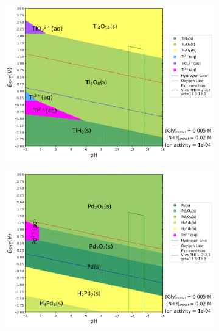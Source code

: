 \documentclass[journal=jacsat,manuscript=article]{achemso}
\begin{document}
\begin{figure}[htbp]
\begin{subfigure}[b]{0.3\textwidth}
        \par\medskip   
    \end{subfigure}
    \begin{subfigure}[b]{0.3\textwidth}
        \includegraphics[width=\textwidth]{Figures/pourbaix_diagrams/Ti-NH3-H2O_activity=1e-04_[NH3]=0.02M_[Gly]=0.005M_[CN]=0.png}
        \subcaption{}\label{fig:Ti_Pourbaix}
    \end{subfigure}
    \begin{subfigure}[b]{0.3\textwidth}
        \includegraphics[width=\textwidth]{Figures/pourbaix_diagrams/Pd-NH3-H2O_activity=1e-04_[NH3]=0.02M_[Gly]=0.005M_[CN]=0.png}
        \subcaption{}\label{fig:Pd_Pourbaix}
    \end{subfigure}

\end{figure}
\end{document}
